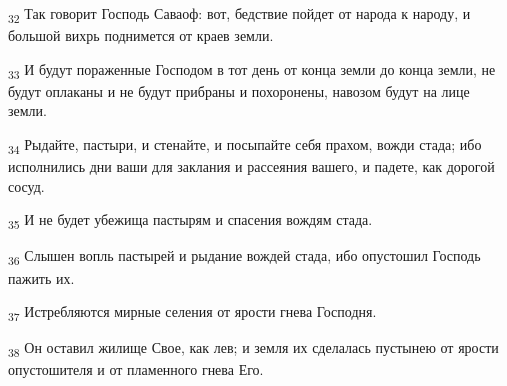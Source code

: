 \begin{tcolorbox}
\textsubscript{32} Так говорит Господь Саваоф: вот, бедствие пойдет от народа к народу, и большой вихрь поднимется от краев земли.
\end{tcolorbox}
\begin{tcolorbox}
\textsubscript{33} И будут пораженные Господом в тот день от конца земли до конца земли, не будут оплаканы и не будут прибраны и похоронены, навозом будут на лице земли.
\end{tcolorbox}
\begin{tcolorbox}
\textsubscript{34} Рыдайте, пастыри, и стенайте, и посыпайте себя прахом, вожди стада; ибо исполнились дни ваши для заклания и рассеяния вашего, и падете, как дорогой сосуд.
\end{tcolorbox}
\begin{tcolorbox}
\textsubscript{35} И не будет убежища пастырям и спасения вождям стада.
\end{tcolorbox}
\begin{tcolorbox}
\textsubscript{36} Слышен вопль пастырей и рыдание вождей стада, ибо опустошил Господь пажить их.
\end{tcolorbox}
\begin{tcolorbox}
\textsubscript{37} Истребляются мирные селения от ярости гнева Господня.
\end{tcolorbox}
\begin{tcolorbox}
\textsubscript{38} Он оставил жилище Свое, как лев; и земля их сделалась пустынею от ярости опустошителя и от пламенного гнева Его.
\end{tcolorbox}
